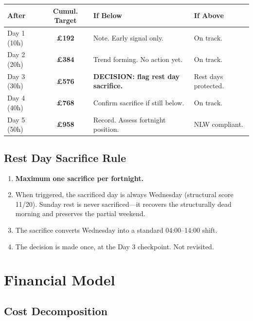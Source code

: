 \documentclass[a4paper,11pt]{article}
\begin{document}
\begin{tabularx}{\textwidth}{l C X X}
\toprule
\textbf{After} & \textbf{Cumul. Target} & \textbf{If Below} & \textbf{If Above} \\
\midrule
Day 1 (10h) & \textbf{\pounds192} & Note. Early signal only. & On track. \\
Day 2 (20h) & \textbf{\pounds384} & Trend forming. No action yet. & On track. \\
 Day 3 (30h) & \textbf{\pounds576} & \textbf{DECISION: flag rest day sacrifice.} & Rest days protected. \\
Day 4 (40h) & \textbf{\pounds768} & Confirm sacrifice if still below. & On track. \\
Day 5 (50h) & \textbf{\pounds958} & Record. Assess fortnight position. & NLW compliant. \\
\bottomrule
\end{tabularx}

\subsection{Rest Day Sacrifice Rule}

\begin{enumerate}[leftmargin=2em]
\item \textbf{Maximum one sacrifice per fortnight.}
\item When triggered, the sacrificed day is always Wednesday (structural score 11/20). Sunday rest is never sacrificed---it recovers the structurally dead morning and preserves the partial weekend.
\item The sacrifice converts Wednesday into a standard 04:00--14:00 shift.
\item The decision is made once, at the Day 3 checkpoint. Not revisited.
\end{enumerate}

\newpage

\section{Financial Model}

\subsection{Cost Decomposition}
\end{document}
